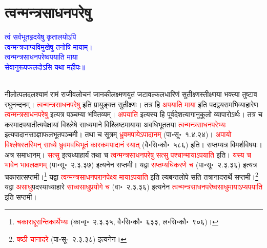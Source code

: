 \section[त्वन्मन्त्र\-साधन\-परेषु]{त्वन्मन्त्र\-साधन\-परेषु}
\centering\textcolor{blue}{त्वं सर्वभूतहृदयेषु कृतालयोऽपि\nopagebreak\\
त्वन्मन्त्रजाप्यविमुखेषु तनोषि मायाम्।\nopagebreak\\
त्वन्मन्त्रसाधनपरेष्वपयाति माया\nopagebreak\\
सेवानुरूपफलदोऽसि यथा महीपः॥}\nopagebreak\\
\\
\begin{sloppypar}\justifying\noindent\hspace{10mm} नीलोत्पल\-दल\-श्यामं रामं राजीव\-लोचनं जानकी\-लक्ष्मण\-युतं जटा\-वल्कल\-धारिणं सुतीक्ष्णस्तीक्ष्णया भक्त्या तुष्टाव रघु\-नन्दनम्। \textcolor{red}{त्वन्मन्त्रसाधन\-परेषु} इति प्रायुङ्क्त सुतीक्ष्णः। तत्र हि \textcolor{red}{अपयाति माया} इति पद\-द्वय\-समभिव्याहारेण \textcolor{red}{त्वन्मन्त्रसाधनपरेषु} इत्यत्र पञ्चम्या भवितव्यम्। \textcolor{red}{अपयाति} इत्यस्य हि पूर्व\-देश\-त्यागानुकूलो व्यापारोऽर्थः। तत्र च कस्मादपयातीत्यपेक्षायां विश्लेषे साध्यमाने विश्लिष्ट\-मायाया अवधि\-भूततया \textcolor{red}{त्वन्मन्त्र\-साधन\-परेभ्यः} इत्यपादान\-सञ्ज्ञा\-फल\-भूत\-पञ्चमी। तथा च सूत्रम् \textcolor{red}{ध्रुवमपायेऽपादानम्‌} (पा॰सू॰~१.४.२४)। \textcolor{red}{अपायो विश्लेषस्तस्मिन् साध्ये ध्रुवमवधि\-भूतं कारकमपादानं स्यात्‌} (वै॰सि॰कौ॰~५८६) इति। सप्तम्यत्र विमर्श\-विषयः। अत्र समाधानम्। \textcolor{red}{सत्सु} इत्यध्याहार्यं तथा च \textcolor{red}{त्वन्मन्त्र\-साधन\-परेषु सत्सु पश्चान्मायाऽपयाति} इति। \textcolor{red}{यस्य च भावेन भाव\-लक्षणम्‌} (पा॰सू॰~२.३.३७) इत्यनेन सप्तमी। यद्वा \textcolor{red}{सप्तम्यधिकरणे च} (पा॰सू॰~२.३.३६) इत्यत्र चकारात्सप्तमी।\footnote{\textcolor{red}{चकाराद्दूरान्तिकार्थेभ्यः} (का॰वृ॰~२.३.३५, वै॰सि॰कौ॰~६३३, ल॰सि॰कौ॰~९०६)।} यद्वा \textcolor{red}{त्वन्मन्त्र\-साधन\-परानपेक्ष्य मायाऽपयाति} इति ल्यबन्त\-लोपे सति तत्रानादरार्थे सप्तमी।\footnote{\textcolor{red}{षष्ठी चानादरे} (पा॰सू॰~२.३.३८) इत्यनेन।} यद्वा \textcolor{red}{असाधु}\-पदस्याध्याहारे \textcolor{red}{साध्व\-साधु\-प्रयोगे च} (वा॰~२.३.३६) इत्यनेन \textcolor{red}{त्वन्मन्त्र\-साधन\-परेष्वसाधु\-मायाऽप्यपयाति} इति सप्तमी।
\end{sloppypar}
